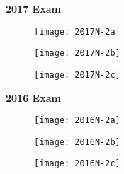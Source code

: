 \documentclass[../resumosRCOM.tex]{subfiles}
\begin{document}
\textbf{2017 Exam}
\begin{figure}[H]
    \centering
    \texttt{[image: 2017N-2a]}
\end{figure} 

\begin{figure}[H] 
    \centering
    \texttt{[image: 2017N-2b]}
\end{figure}

\begin{figure}[H]
    \centering
    \texttt{[image: 2017N-2c]}
\end{figure}


\textbf{2016 Exam}

\begin{figure}[H]
    \centering
    \texttt{[image: 2016N-2a]}
\end{figure}

\begin{figure}[H]
    \centering
    \texttt{[image: 2016N-2b]}
\end{figure}

\begin{figure}[H]
    \centering
    \texttt{[image: 2016N-2c]}
\end{figure}
\end{document}
